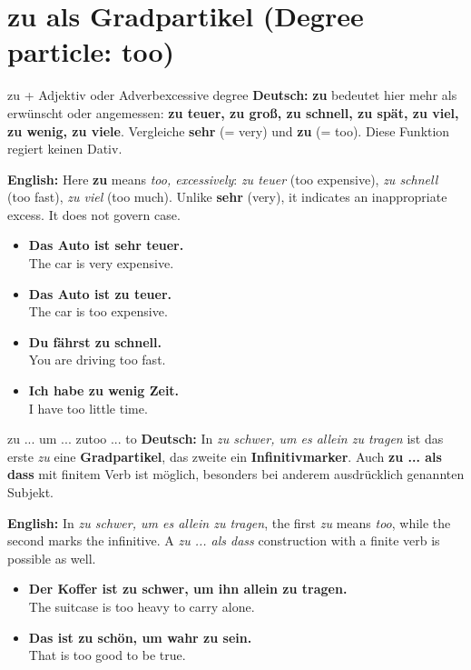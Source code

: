 \documentclass[a4paper,11pt]{article}
\newcommand{\GermanText}[1]{\textbf{Deutsch: }#1\par}
\newcommand{\EnglishText}[1]{{\small\color{SoftGray}\textbf{English: }#1\par}}
\newcommand{\ExampleItem}[2]{\item \textbf{#1}\\{\small\color{SoftGray}#2}}
\begin{document}
\section{zu als Gradpartikel (Degree particle: too)}
\begin{grammarentry}{zu + Adjektiv oder Adverb}{excessive degree}
\GermanText{\textbf{zu} bedeutet hier \glqq mehr als erwünscht oder angemessen\grqq{}: \textbf{zu teuer, zu groß, zu schnell, zu spät, zu viel, zu wenig, zu viele}. Vergleiche \textbf{sehr} (= very) und \textbf{zu} (= too). Diese Funktion regiert keinen Dativ.}
\EnglishText{Here \textbf{zu} means \emph{too, excessively}: \emph{zu teuer} (too expensive), \emph{zu schnell} (too fast), \emph{zu viel} (too much). Unlike \textbf{sehr} (very), it indicates an inappropriate excess. It does not govern case.}
\end{grammarentry}
\begin{exbox}
\begin{itemize}
\ExampleItem{Das Auto ist sehr teuer.}{The car is very expensive.}
\ExampleItem{Das Auto ist zu teuer.}{The car is too expensive.}
\ExampleItem{Du fährst zu schnell.}{You are driving too fast.}
\ExampleItem{Ich habe zu wenig Zeit.}{I have too little time.}
\end{itemize}
\end{exbox}
\begin{grammarentry}{zu ... um ... zu}{too ... to}
\GermanText{In \emph{zu schwer, um es allein zu tragen} ist das erste \emph{zu} eine \textbf{Gradpartikel}, das zweite ein \textbf{Infinitivmarker}. Auch \textbf{zu ... als dass} mit finitem Verb ist möglich, besonders bei anderem ausdrücklich genannten Subjekt.}
\EnglishText{In \emph{zu schwer, um es allein zu tragen}, the first \emph{zu} means \emph{too}, while the second marks the infinitive. A \emph{zu ... als dass} construction with a finite verb is possible as well.}
\end{grammarentry}
\begin{exbox}
\begin{itemize}
\ExampleItem{Der Koffer ist zu schwer, um ihn allein zu tragen.}{The suitcase is too heavy to carry alone.}
\ExampleItem{Das ist zu schön, um wahr zu sein.}{That is too good to be true.}
\end{itemize}
\end{exbox}
\end{document}
